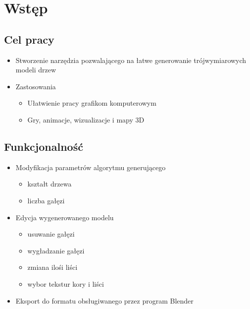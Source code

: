 \chapter{Wstęp}

\section{Cel pracy}
\begin{itemize}
	\item{Stworzenie narzędzia pozwalającego na łatwe generowanie trójwymiarowych modeli drzew}
	\item{Zastosowania}
	\begin{itemize}
		\item{Ułatwienie pracy grafikom komputerowym}
		\item{Gry, animacje, wizualizacje i mapy 3D}
	\end{itemize}
\end{itemize}




\section{Funkcjonalność}
\begin{itemize}
	\item{Modyfikacja parametrów algorytmu generującego}
	\begin{itemize}
		\item{kształt drzewa}
		\item{liczba gałęzi}
	\end{itemize}
	\item{Edycja wygenerowanego modelu}
	\begin{itemize}
		\item{usuwanie gałęzi}
		\item{wygładzanie gałęzi}
		\item{zmiana ilośi liści}
		\item{wybor tekstur kory i liści}
	\end{itemize}

	\item{Eksport do formatu obsługiwanego przez program Blender}
\end{itemize}


